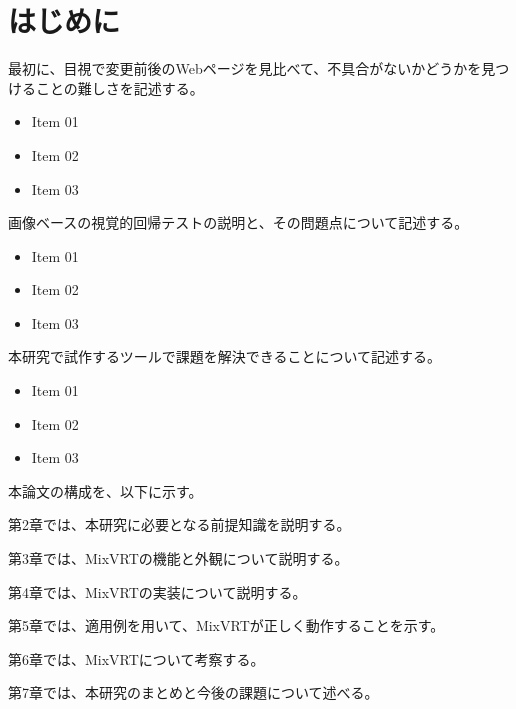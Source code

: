 \chapter{はじめに}\label{cha:Introduction}

最初に、目視で変更前後のWebページを見比べて、不具合がないかどうかを見つけることの難しさを記述する。
\begin{itemize}
    \item Item 01
    \item Item 02
    \item Item 03
\end{itemize}

画像ベースの視覚的回帰テストの説明と、その問題点について記述する。
\begin{itemize}
    \item Item 01
    \item Item 02
    \item Item 03
\end{itemize}

本研究で試作するツールで課題を解決できることについて記述する。
\begin{itemize}
    \item Item 01
    \item Item 02
    \item Item 03
\end{itemize}

\par
本論文の構成を、以下に示す。\par
第2章では、本研究に必要となる前提知識を説明する。\par
第3章では、MixVRTの機能と外観について説明する。\par
第4章では、MixVRTの実装について説明する。\par
第5章では、適用例を用いて、MixVRTが正しく動作することを示す。\par
第6章では、MixVRTについて考察する。\par
第7章では、本研究のまとめと今後の課題について述べる。



